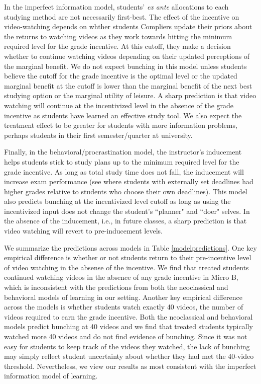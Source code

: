 \documentclass[12pt]{article}
\begin{document}
In the imperfect information model, students' \textit{ex ante} allocations to each studying method are not necessarily first-best. The effect of the incentive on video-watching depends on whther students Compliers update their priors about the returns to watching videos as they work towards hitting the minimum required level for the grade incentive. At this cutoff, they make a decision whether to continue watching videos depending on their updated perceptions of the marginal benefit. We do not expect bunching in this model unless students believe the cutoff for the grade incentive is the optimal level or the updated marginal benefit at the cutoff is lower than the marginal benefit of the next best studying option or the marginal utility of leisure. A sharp prediction is that video watching will continue at the incentivized level in the absence of the grade incentive as students have learned an effective study tool. We also expect the treatment effect to be greater for students with more information problems, perhaps students in their first semester/quarter at university.

Finally, in the behavioral/procrastination model, the instructor's inducement helps students stick to study plans up to the minimum required level for the grade incentive. As long as total study time does not fall, the inducement will increase exam performance (see \textcite{aw2002} where students with externally set deadlines had higher grades relative to students who choose their own deadlines). This model also predicts bunching at the incentivized level cutoff as long as using the incentivized input does not change the student's ``planner" and ``doer" selves. In the absence of the inducement, i.e., in future classes, a sharp prediction is that video watching will revert to pre-inducement levels.


We summarize the predictions across models in Table \ref{modelpredictions}.  One key empirical difference is whether or not students return to their pre-incentive level of video watching in the absense of the incentive. We find that treated students continued watching videos in the absence of any grade incentive in Micro B, which is inconsistent with the predictions from both the neoclassical and behavioral models of learning in our setting. Another key empirical difference across the models is whether students watch exactly 40 videos, the number of videos required to earn the grade incentive. Both the neoclassical and behavioral models predict bunching at 40 videos and we find that treated students typically watched more 40 videos and do not find evidence of bunching. Since it was not easy for students to keep track of the videos they watched, the lack of bunching may simply reflect student uncertainty about whether they had met the 40-video threshold. Nevertheless, we view our results as most consistent with the imperfect information model of learning.
\end{document}
